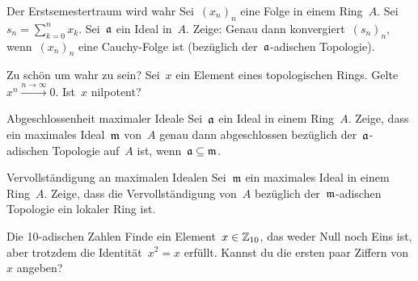 \documentclass[entwurf]{uebblatt}
\begin{document}

\begin{aufgabe}{}{Der Erstsemestertraum wird wahr}
Sei~$(x_n)_n$ eine Folge in einem Ring~$A$. Sei~$s_n = \sum_{k=0}^n x_k$. Sei~$\mathfrak{a}$ ein Ideal in~$A$.
Zeige: Genau dann konvergiert~$(s_n)_n$, wenn~$(x_n)_n$ eine Cauchy-Folge ist (bezüglich
der~$\mathfrak{a}$-adischen Topologie).
\end{aufgabe}

\begin{aufgabe}{}{Zu schön um wahr zu sein?}
Sei~$x$ ein Element eines topologischen Rings. Gelte~$x^n \xrightarrow{n \to
\infty} 0$. Ist~$x$ nilpotent?
\end{aufgabe}

\begin{aufgabe}{}{Abgeschlossenheit maximaler Ideale}
Sei~$\mathfrak{a}$ ein Ideal in einem Ring~$A$. Zeige, dass ein maximales Ideal~$\mathfrak{m}$
von~$A$ genau dann abgeschlossen bezüglich der~$\mathfrak{a}$-adischen Topologie
auf~$A$ ist, wenn~$\mathfrak{a} \subseteq \mathfrak{m}$.
\end{aufgabe}

\begin{aufgabe}{}{Vervollständigung an maximalen Idealen}
Sei~$\mathfrak{m}$ ein maximales Ideal in einem Ring~$A$. Zeige, dass die
Vervollständigung von~$A$ bezüglich der~$\mathfrak{m}$-adischen Topologie ein lokaler
Ring ist.
\end{aufgabe}

\begin{aufgabe}{}{Die 10-adischen Zahlen}
Finde ein Element~$x \in \mathbb{Z}_{10}$, das weder Null noch Eins ist, aber trotzdem
die Identität~$x^2 = x$ erfüllt. Kannst du die ersten paar Ziffern von~$x$
angeben?
\end{aufgabe}
\end{document}
